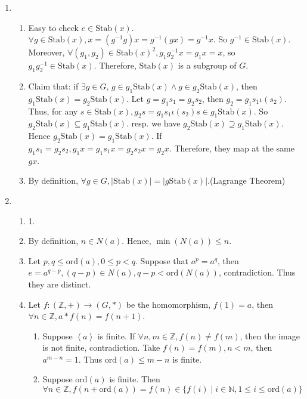 \documentclass[12pt]{article}
\newcommand{\NN}{\mathbb{N}}
\newcommand{\ZZ}{\mathbb{Z}}
\begin{document}
\begin{enumerate}
\begin{enumerate}
        \end{enumerate}
    \item 
        \begin{enumerate}
            \item Easy to check $e\in \mathrm{Stab}(x)$. $\forall g\in \mathrm{Stab}(x), x=(g^{-1}g)x=g^{-1}(gx)=g^{-1}x$. So $g^{-1}\in \mathrm{Stab}(x)$. Moreover, $\forall (g_1,g_2)\in \mathrm{Stab}(x)^2,g_1g_2^{-1}x=g_1 x=x$, so $g_1g_2^{-1}\in \mathrm{Stab}(x)$. Therefore, $\mathrm{Stab}(x)$ is a subgroup of $G$.
            \item Claim that: if $\exists g\in G$, $g\in g_1\mathrm{Stab}(x)\wedge g\in g_2\mathrm{Stab}(x)$, then $g_1\mathrm{Stab}(x)=g_2\mathrm{Stab}(x)$. Let $g=g_1s_1=g_2s_2$, then $g_2=g_1s_1\iota(s_2)$. Thus, for any $s\in \mathrm{Stab}(x),g_2s=g_1s_1\iota(s_2)s\in g_1\mathrm{Stab}(x)$.
                \newline So $g_2\mathrm{Stab}(x)\subseteq g_1\mathrm{Stab}(x)$. resp. we have $g_2\mathrm{Stab}(x)\supseteq g_1\mathrm{Stab}(x)$. Hence $g_2\mathrm{Stab}(x)=g_1\mathrm{Stab}(x)$. If $g_1s_1=g_2s_2, g_1x=g_1s_1x=g_2s_2x=g_2x$. Therefore, they map at the same $gx$.
            \item By definition, $\forall g\in G,\left|\mathrm{Stab}(x)\right|=\left|g \mathrm{Stab}(x)\right|$.(Lagrange Theorem)
        \end{enumerate}
    \item 
        \begin{enumerate}
            \item 1.
            \item By definition, $n\in N(a)$. Hence, $\min(N(a))\le n$.
            \item Let $p,q\le \mathrm{ord}(a),0\le p<q$. Suppose that $a^p=a^q$, then $e=a^{q-p},(q-p)\in N(a),q-p<\mathrm{ord}(N(a))$, contradiction. Thus they are distinct.
            \item Let $f:(\ZZ,+)\rightarrow (G,*)$ be the homomorphism, $f(1)=a$, then $\forall n\in \ZZ, a*f(n)=f(n+1)$.
                \begin{enumerate}
                    \item Suppose $\left \langle a \right \rangle $ is finite. If $\forall n,m\in \ZZ,f(n)\not=f(m)$, then the image is not finite, contradiction. Take $f(n)=f(m), n<m$, then $a^{m-n}=1$. Thus $\mathrm{ord}(a)\le m-n$ is finite.
                    \item Suppose $\mathrm{ord}(a)$ is finite. Then $\forall n\in \ZZ, f(n+\mathrm{ord}(a))=f(n)\in\{f(i)\mid i\in \NN,1\le i\le \mathrm{ord}(a) \}$

\end{enumerate}
\end{enumerate}
\end{enumerate}
\end{document}
